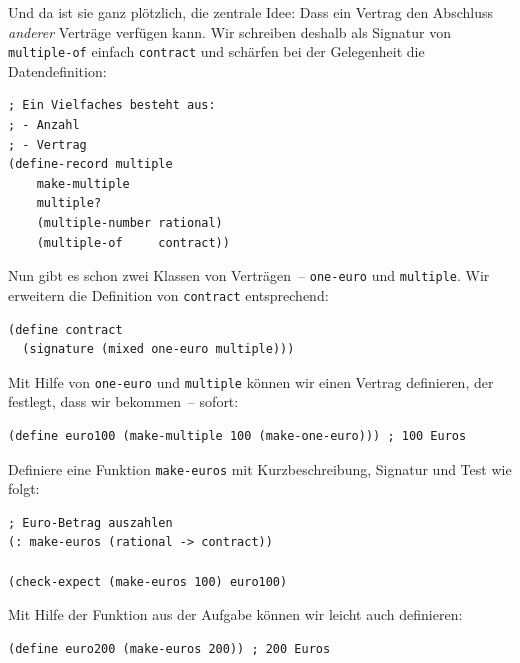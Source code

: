 Und da ist sie ganz plötzlich, die zentrale Idee: Dass ein Vertrag den
Abschluss \emph{anderer} Ver\-träge verfügen kann.  Wir schreiben
deshalb als Signatur von \lstinline{multiple-of} einfach
\lstinline{contract} und schärfen bei der Gelegenheit die Datendefinition:
%
\begin{lstlisting}
; Ein Vielfaches besteht aus:
; - Anzahl
; - Vertrag 
(define-record multiple
    make-multiple
    multiple?
    (multiple-number rational)
    (multiple-of     contract))
\end{lstlisting}
%
Nun gibt es schon zwei Klassen von Verträgen~-- \lstinline{one-euro} und
\lstinline{multiple}.  Wir erweitern die Definition von
\lstinline{contract} entsprechend:
%
\begin{lstlisting}
(define contract
  (signature (mixed one-euro multiple)))
\end{lstlisting}
%
Mit Hilfe von \lstinline{one-euro} und \lstinline{multiple} können wir
einen Vertrag definieren, der festlegt, dass wir  bekommen~--
sofort:
%
\begin{lstlisting}
(define euro100 (make-multiple 100 (make-one-euro))) ; 100 Euros
\end{lstlisting}
%
\begin{aufgabeinline}
  Definiere eine Funktion \lstinline{make-euros} mit Kurzbeschreibung,
  Signatur und Test wie folgt:
\begin{lstlisting}
; Euro-Betrag auszahlen
(: make-euros (rational -> contract))

(check-expect (make-euros 100) euro100)
\end{lstlisting}
\end{aufgabeinline}
%
Mit Hilfe der Funktion aus der Aufgabe können wir leicht auch
 definieren:
%
\begin{lstlisting}
(define euro200 (make-euros 200)) ; 200 Euros
\end{lstlisting}

